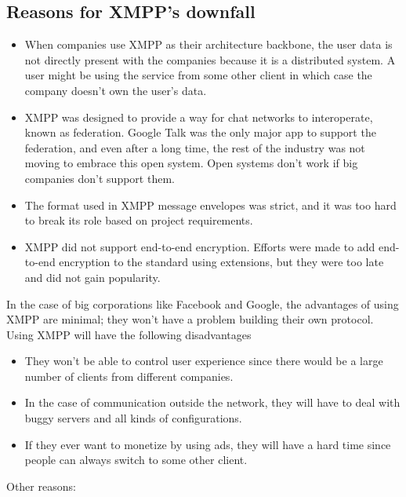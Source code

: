 \documentclass[11pt, conference, a4paper]{IEEEtran}
\begin{document}
\subsection{Reasons for XMPP's downfall}
\begin{itemize}
\item When companies use XMPP as their architecture backbone, the user data is not directly present with the companies because it is a distributed system. A user might be using the service from some other client in which case the company doesn’t own the user’s data.
\item XMPP was designed to provide a way for chat networks to interoperate, known as federation. Google Talk was the only major app to support the federation, and even after a long time, the rest of the industry was not moving to embrace this open system. Open systems don't work if big companies don't support them.
\item The format used in XMPP message envelopes was strict, and it was too hard to break its role based on project requirements.
\item XMPP did not support end-to-end encryption. Efforts were made to add end-to-end encryption to the standard using extensions, but they were too late and did not gain popularity.
\end{itemize}
In the case of big corporations like Facebook and Google, the advantages of using XMPP are minimal; they won't have a problem building their own protocol.\\
Using XMPP will have the following disadvantages
\begin{itemize}
\item They won't be able to control user experience since there would be a large number of clients from different companies.
\item In the case of communication outside the network, they will have to deal with buggy servers and all kinds of configurations.
\item If they ever want to monetize by using ads, they will have a hard time since people can always switch to some other client.
\end{itemize}
Other reasons:
\end{document}
